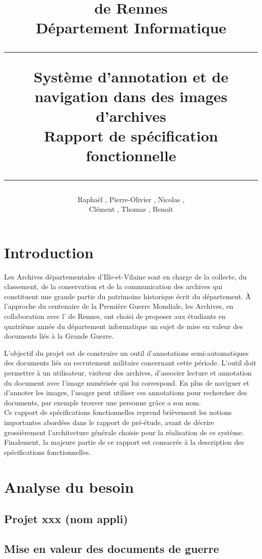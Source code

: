 \documentclass[a4paper]{article}
\title{\bsc{INSA} de Rennes \\ Département Informatique \\ \bigskip \hrule \bigskip Système d'annotation et de navigation dans des images d'archives \\ \bigskip Rapport de spécification fonctionnelle \bigskip \hrule}
\author{Raphaël \bsc{Baron}, Pierre-Olivier \bsc{Bouteau}, Nicolas \bsc{Charpentier}, \\ Clément \bsc{Leboullenger}, Thomas \bsc{François}, Benoit \bsc{Travers}}
\begin{document}
\maketitle
\thispagestyle{empty}

\newpage
\tableofcontents
\thispagestyle{empty}

\newpage
\section*{Introduction}

	Les Archives départementales d'Ille-et-Vilaine sont en charge de la collecte, du classement, de la conservation et de la communication des archives qui constituent une grande partie du patrimoine historique écrit du département. 
\`À l'approche du centenaire de la Première Guerre Mondiale, les Archives, en collaboration avec l' de Rennes, ont choisi de proposer aux étudiants en quatrième année du département informatique un sujet de mise en valeur des documents li\'es \`a la Grande Guerre.

	L'objectif du projet est de construire un outil d'annotations semi-auto\-matiques des documents liés au recrutement militaire concernant cette période. L'outil doit permettre à un utilisateur, visiteur des archives, d'associer lecture et annotation du document avec l'image numérisée qui lui correspond. En plus de naviguer et d'annoter les images, l'usager peut utiliser ces annotations pour rechercher des documents, par exemple trouver une personne grâce a son nom.\\
	
	Ce rapport de spécifications fonctionnelles reprend brièvement les notions importantes abordées dans le rapport de pré-étude, avant de décrire grossièrement l'architecture générale choisie pour la réalisation de ce système. Finalement, la majeure partie de ce rapport est consacrée à la description des spécifications fonctionnelles.

\newpage

\section{Analyse du besoin}
\subsection{Projet xxx (nom appli)}

\subsection{Mise en valeur des documents de guerre}
\end{document}
